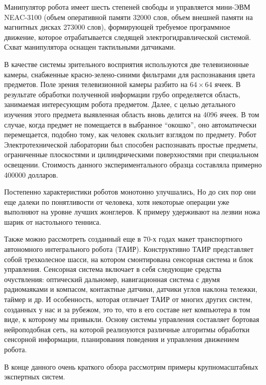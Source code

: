 Манипулятор робота имеет шесть степеней свободы и управляется мини-ЭВМ NEAC-3100 (объем оперативной памяти 32000 слов, объем внешней памяти на магнитных дисках 273000 слов), формирующей требуемое программное движение, которое отрабатывается следящей электрогидравлической системой. Схват манипулятора оснащен тактильными датчиками.

В качестве системы зрительного восприятия используются две телевизионные камеры, снабженные красно-зелено-синими фильтрами для распознавания цвета предметов. Поле зрения телевизионной камеры разбито на $64 \times 64$ ячеек. В результате обработки полученной информации грубо определяется область, занимаемая интересующим робота предметом. Далее, с целью детального изучения этого предмета выявленная область вновь делится на 4096 ячеек. В том случае, когда предмет не помещается в выбранное ``окошко'', оно автоматически перемещается, подобно тому, как человек скользит взглядом по предмету. Робот Электротехнической лаборатории был способен распознавать простые предметы, ограниченные плоскостями и цилиндрическими поверхностями при специальном освещении. Стоимость данного экспериментального образца составляла примерно 400000 долларов.

Постепенно характеристики роботов монотонно улучшались, Но до сих пор они еще далеки по понятливости от человека, хотя некоторые операции уже выполняют на уровне лучших жонглеров. К примеру удерживают на лезвии ножа шарик от настольного тенниса.

Также можно рассмотреть созданный еще в 70-х годах макет транспортного автономного интегрального робота (ТАИР). Конструктивно ТАИР представляет собой трехколесное шасси, на котором смонтирована сенсорная система и блок управления. Сенсорная система включает в себя следующие средства очуствления: оптический дальномер, навигационная система с двумя радиомаяками и компасом, контактные датчики, датчики углов наклона тележки, таймер и др. И особенность, которая отличает ТАИР от многих других систем, созданных у нас и за рубежом, это то, что в его составе нет компьютера в том виде, к которому мы привыкли. Основу системы управления составляет бортовая нейроподобная сеть, на которой реализуются различные алгоритмы обработки сенсорной информации, планирования поведения и управления движением робота.

В конце данного очень краткого обзора рассмотрим примеры крупномасштабных экспертных систем.

